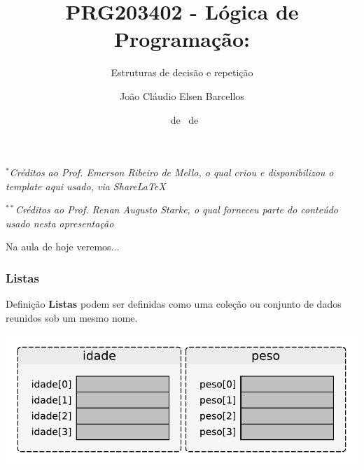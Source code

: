 \documentclass{beamer}
\title{PRG203402 - Lógica de Programação:}
\subtitle{\LARGE Estruturas de decisão e repetição}
\author{João Cláudio Elsen Barcellos}
\date{\scriptsize \DAY~de \MONTH~de \YEAR}
\institute{
  Engenheiro Eletricista\\
  Formado na Universidade Federal de Santa Catarina\\
  campus Florianópolis\\
  \url{joaoclaudiobarcellos@gmail.com}
}
\begin{document}
\captionsetup{labelformat=empty}

\begin{frame}[t]
    \maketitle
    \vspace{-1cm}
    \begin{flushleft}
        \vfill
        \textit{\tiny $^{*}$Créditos ao Prof. Emerson Ribeiro de Mello, o qual criou e disponibilizou o template aqui usado, via ShareLaTeX}\par
        \textit{\tiny $^{**}$Créditos ao Prof. Renan Augusto Starke, o qual forneceu parte do conteúdo usado nesta apresentação}
    \end{flushleft}
\end{frame}

\begin{frame}[t]{Na aula de hoje veremos...}
    \tableofcontents
\end{frame}

\begin{frame}[fragile]
\frametitle{Listas}

    \vfill \begin{block}{Definição}
        \textbf{Listas} podem ser definidas como uma coleção ou conjunto de dados reunidos sob um mesmo nome.
    \end{block}


    \vfill\begin{center}
     \includegraphics[scale=0.6]{./figures/listas_01.pdf}
     \end{center}
\end{frame}
\end{document}
